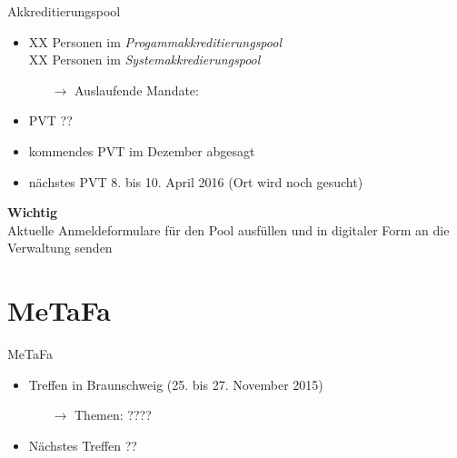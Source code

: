 \documentclass[compress,]{beamer}
\begin{document}
\begin{frame}{Akkreditierungspool}
	\begin{itemize}
		\item XX Personen im \emph{Progammakkreditierungspool}\\
			XX Personen im \emph{Systemakkredierungspool}
			\begin{itemize}
				\item[$\rightarrow$] Auslaufende Mandate:
			\end{itemize}
		\item PVT ??
		\item kommendes PVT im Dezember abgesagt
		\item nächstes PVT 8. bis 10. April 2016 (Ort wird noch gesucht)
	\end{itemize}
\end{frame}

\begin{frame}
	\begin{framed}
		\begin{center}
			{\Huge \textbf{Wichtig}}\\
			\vspace{0.5cm}
			{\Large Aktuelle Anmeldeformulare für den Pool ausfüllen und in digitaler Form an die Verwaltung senden}
		\end{center}
	\end{framed}
\end{frame}

\section{MeTaFa}

\begin{frame}{MeTaFa}
	\begin{itemize}
		\item Treffen in Braunschweig (25. bis 27. November 2015)
			\begin{itemize}
				\item[$\rightarrow$] Themen: ????
			\end{itemize}
		\item Nächstes Treffen ??
	\end{itemize}
\end{frame}
\end{document}
